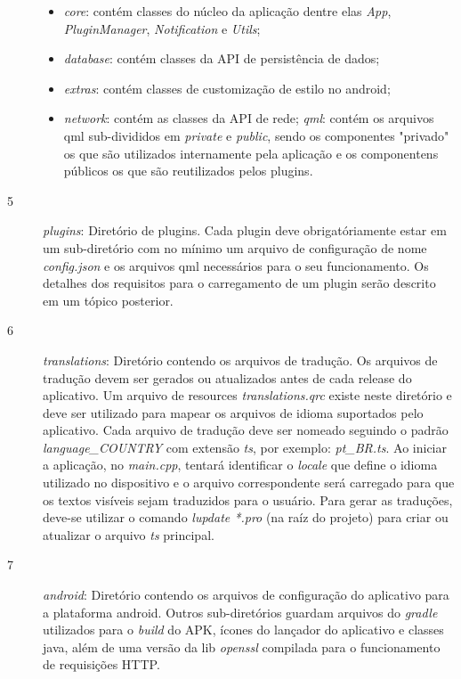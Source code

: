 \begin{description}
	\begin{itemize}
		\item \textit{core}: contém classes do núcleo da aplicação dentre elas \textit{App}, \textit{PluginManager}, \textit{Notification} e \textit{Utils};
		\item \textit{database}: contém classes da API de persistência de dados;
		\item \textit{extras}: contém classes de customização de estilo no android;
		\item \textit{network}: contém as classes da API de rede;
		\textit{qml}: contém os arquivos qml sub-divididos em \textit{private} e \textit{public}, sendo os componentes "privado" os que são utilizados internamente pela aplicação e os componentens públicos os que são reutilizados pelos plugins.
	\end{itemize}

	\item[5] \textit{plugins}: Diretório de plugins. Cada plugin deve obrigatóriamente estar em um sub-diretório com no mínimo um arquivo de configuração de nome \textit{config.json} e os arquivos qml necessários para o seu funcionamento. Os detalhes dos requisitos para o carregamento de um plugin serão descrito em um tópico posterior.

	\item[6] \textit{translations}: Diretório contendo os arquivos de tradução. Os arquivos de tradução devem ser gerados ou atualizados antes de cada release do aplicativo. Um arquivo de resources \textit{translations.qrc} existe neste diretório e deve ser utilizado para mapear os arquivos de idioma suportados pelo aplicativo. Cada arquivo de tradução deve ser nomeado seguindo o padrão \textit{language\_COUNTRY} com extensão \textit{ts}, por exemplo: \textit{pt\_BR.ts}. Ao iniciar a aplicação, no \textit{main.cpp}, tentará identificar o \textit{locale} que define o idioma utilizado no dispositivo e o arquivo correspondente será carregado para que os textos visíveis sejam traduzidos para o usuário. Para gerar as traduções, deve-se utilizar o comando \textit{lupdate *.pro} (na raíz do projeto) para criar ou atualizar o arquivo \textit{ts} principal.

	\item[7] \textit{android}: Diretório contendo os arquivos de configuração do aplicativo para a plataforma android. Outros sub-diretórios guardam arquivos do \textit{gradle} utilizados para o \textit{build} do APK, ícones do lançador do aplicativo e classes java, além de uma versão da lib \textit{openssl} compilada para o funcionamento de requisições HTTP.


\end{description}
